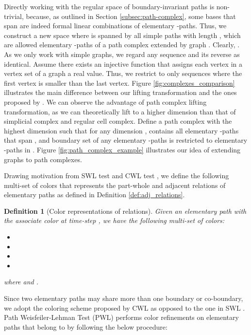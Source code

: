 \documentclass[letterpaper]{article} \usepackage{aaai24}  \usepackage{times}  \usepackage{helvet}  \usepackage{courier}  \usepackage[hyphens]{url}  \usepackage{graphicx} \urlstyle{rm} \def\UrlFont{\rm}  \usepackage{natbib}  \usepackage{caption} \frenchspacing  \setlength{\pdfpagewidth}{8.5in} \setlength{\pdfpageheight}{11in} \usepackage{algorithm}
\newtheorem{definition}{Definition}
\begin{document}
Directly working with the regular space of boundary-invariant paths  is non-trivial, because, as outlined in Section \ref{subsec:path-complex}, some bases that span  are indeed formal linear combinations of elementary -paths. Thus, we construct a new space  where  is spanned by all simple paths with length , which are allowed elementary -paths of a path complex  extended by graph . Clearly,  . As we only work with simple graphs, we regard any sequence and its reverse as identical. Assume there exists an injective function  that assigns each vertex in a vertex set  of a graph  a real value. Thus, we restrict  to only sequences where the first vertex is smaller than the last vertex. Figure \ref{fig:complexes_comparison} illustrates the main difference between our lifting transformation and the ones proposed by \cite{bodnar_weisfeiler_2021, bodnar_weisfeiler_2022}. We can observe the advantage of path complex lifting transformation, as we can theoretically lift to a higher dimension than that of simplicial complex and regular cell complex. Define  a path complex with the highest dimension  such that for any dimension ,  contains all elementary -paths that span , and boundary set of any elementary -paths is restricted to elementary -paths in . Figure \ref{fig:path_complex_example} illustrates our idea of extending graphs to path complexes.

Drawing motivation from SWL test \cite{bodnar_weisfeiler_2021} and CWL test \cite{bodnar_weisfeiler_2022}, we define the following multi-set of colors that represents the part-whole and adjacent relations of elementary paths as defined in Definition  \ref{def:adj_relations}.

\begin{definition}[Color representations of relations]
    Given an elementary path  with the associate color  at time-step , we have the following multi-set of colors:
    \begin{itemize}
    \item 
    \item 
    \item 
    \item 
    \end{itemize}
    where  and .
\end{definition}

Since two elementary paths may share more than one boundary or co-boundary, we adopt the coloring scheme proposed by CWL \cite{bodnar_weisfeiler_2022} as opposed to the one in SWL \cite{bodnar_weisfeiler_2021}. Path Weisfeiler-Lehman Test (PWL) performs color refinements on elementary paths that belong to  by following the below procedure:
\end{document}
